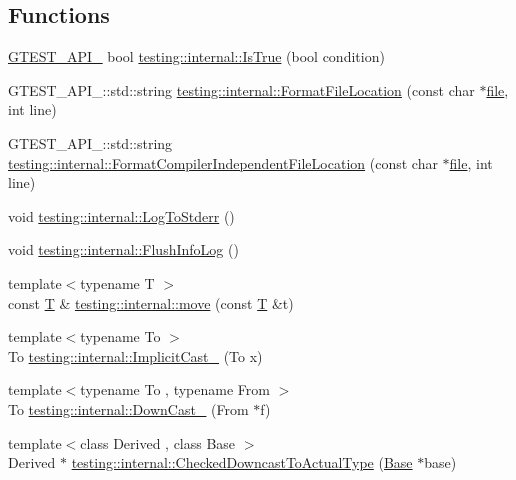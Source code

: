 \subsection*{Functions}
\begin{DoxyCompactItemize}
\item 
\hyperlink{gtest-port_8h_aa73be6f0ba4a7456180a94904ce17790}{G\+T\+E\+S\+T\+\_\+\+A\+P\+I\+\_\+} bool \hyperlink{namespacetesting_1_1internal_a527b9bcc13669b9a16400c8514266254}{testing\+::internal\+::\+Is\+True} (bool condition)
\item 
G\+T\+E\+S\+T\+\_\+\+A\+P\+I\+\_\+\+::std\+::string \hyperlink{namespacetesting_1_1internal_a31b7c3abed4a7c395f42c61e993989f4}{testing\+::internal\+::\+Format\+File\+Location} (const char $\ast$\hyperlink{_07copy_08_2_read_camera_model_8m_a151631b2fd2bb776ef06c9f440a7ed74}{file}, int line)
\item 
G\+T\+E\+S\+T\+\_\+\+A\+P\+I\+\_\+\+::std\+::string \hyperlink{namespacetesting_1_1internal_a1ee4cde97868c53e442d3182496a9f3c}{testing\+::internal\+::\+Format\+Compiler\+Independent\+File\+Location} (const char $\ast$\hyperlink{_07copy_08_2_read_camera_model_8m_a151631b2fd2bb776ef06c9f440a7ed74}{file}, int line)
\item 
void \hyperlink{namespacetesting_1_1internal_a06b1b20029fbd1dbeb59752f914fab84}{testing\+::internal\+::\+Log\+To\+Stderr} ()
\item 
void \hyperlink{namespacetesting_1_1internal_a2135f223bf6b527729aeaa651115183b}{testing\+::internal\+::\+Flush\+Info\+Log} ()
\item 
{\footnotesize template$<$typename T $>$ }\\const \hyperlink{functions__7_8js_adf1f3edb9115acb0a1e04209b7a9937b}{T} \& \hyperlink{namespacetesting_1_1internal_a0f6d06bf8c3093b9c22bb08723db201e}{testing\+::internal\+::move} (const \hyperlink{functions__7_8js_adf1f3edb9115acb0a1e04209b7a9937b}{T} \&t)
\item 
{\footnotesize template$<$typename To $>$ }\\To \hyperlink{namespacetesting_1_1internal_a982df3f369643b175f79cda4048bc3b9}{testing\+::internal\+::\+Implicit\+Cast\+\_\+} (To x)
\item 
{\footnotesize template$<$typename To , typename From $>$ }\\To \hyperlink{namespacetesting_1_1internal_a1a1a1aed3fe00908b8a45d5ab4a33665}{testing\+::internal\+::\+Down\+Cast\+\_\+} (From $\ast$f)
\item 
{\footnotesize template$<$class Derived , class Base $>$ }\\Derived $\ast$ \hyperlink{namespacetesting_1_1internal_abfe9bfb020d38aa4e0e12c001911b22b}{testing\+::internal\+::\+Checked\+Downcast\+To\+Actual\+Type} (\hyperlink{class_base}{Base} $\ast$base)

\end{DoxyCompactItemize}
